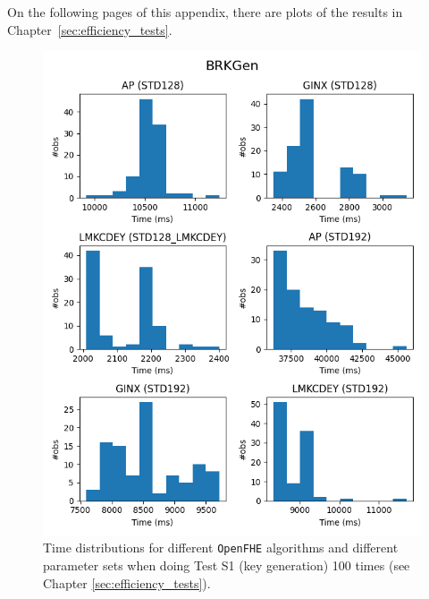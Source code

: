 On the following pages of this appendix, there are plots of the results in Chapter~\ref{sec:efficiency_tests}.


\begin{figure}[ht]
    \centering
    \includegraphics[width=\textwidth]{data/figures/BRKGen_distributions_1.png}
    \caption{Time distributions for different \texttt{OpenFHE} algorithms and different parameter sets when doing Test S1 (key generation) 100 times (see Chapter \ref{sec:efficiency_tests}).}
    \label{fig:distr_brkgen1}
\end{figure}

